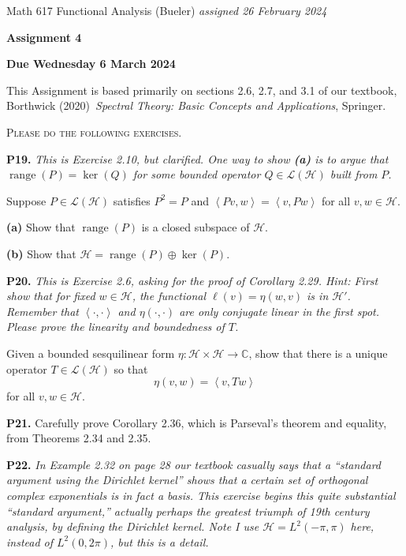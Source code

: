 \documentclass[12pt]{amsart}
\newcommand{\cH}{\mathcal{H}}
\newcommand{\cL}{\mathcal{L}}
\newcommand{\CC}{\mathbb{C}}
\newcommand{\ip}[2]{\ensuremath{\left<#1,#2\right>}}
\newcommand{\range}{\operatorname{range}}
\newcommand{\prob}[1]{\bigskip\noindent\textbf{#1.}\quad }
\newcommand{\epart}[1]{\medskip\noindent\textbf{(#1)}\quad }
\begin{document}
\scriptsize \noindent Math 617 Functional Analysis (Bueler) \hfill \emph{assigned 26 February 2024}
\normalsize\medskip

\Large\centerline{\textbf{Assignment 4}}
\large
\medskip

\centerline{\textbf{Due Wednesday 6 March 2024}}
\medskip
\normalsize

\thispagestyle{empty}

\bigskip
\noindent This Assignment is based primarily on sections 2.6, 2.7, and 3.1 of our textbook, Borthwick (2020)~\emph{Spectral Theory: Basic Concepts and Applications}, Springer.

\medskip
\noindent \textsc{Please do the following exercises.}
\smallskip


\prob{P19}  \emph{This is Exercise 2.10, but clarified.  One way to show \emph{\textbf{(a)}} is to argue that $\range(P)=\ker(Q)$ for some bounded operator $Q\in\cL(\cH)$ built from $P$.}

\medskip\noindent Suppose $P\in\cL(\cH)$ satisfies $P^2=P$ and $\ip{Pv}{w} = \ip{v}{Pw}$ for all $v,w\in\cH$.

\epart{a}  Show that $\range(P)$ is a closed subspace of $\cH$.

\epart{b}  Show that $\cH = \range(P) \oplus \ker(P)$.

\prob{P20}  \emph{This is Exercise 2.6, asking for the proof of Corollary 2.29.  Hint: First show that for fixed $w\in\cH$, the functional $\ell(v) = \eta(w,v)$ is in $\cH'$.  Remember that $\ip{\cdot}{\cdot}$ and $\eta(\cdot,\cdot)$ are only conjugate linear in the first spot.  Please prove the linearity and boundedness of $T$.}

\medskip\noindent Given a bounded sesquilinear form $\eta:\cH\times \cH \to \CC$, show that there is a unique operator $T\in \cL(\cH)$ so that
	$$\eta(v,w) = \ip{v}{Tw}$$
for all $v,w\in\cH$.


\prob{P21}  Carefully prove Corollary 2.36, which is Parseval's theorem and equality, from Theorems 2.34 and 2.35.


\prob{P22}  \emph{In Example 2.32 on page 28 our textbook casually says that a ``standard argument using the Dirichlet kernel'' shows that a certain set of orthogonal complex exponentials is in fact a basis.  This exercise begins this quite substantial ``standard argument,'' actually perhaps the greatest triumph of 19th century analysis, by defining the Dirichlet kernel.  Note I use $\cH=L^2(-\pi,\pi)$ here, instead of $L^2(0,2\pi)$, but this is a detail.}
\end{document}
